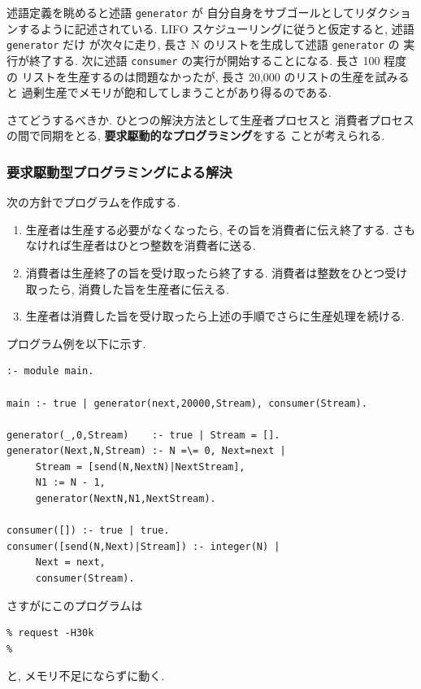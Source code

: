\documentclass[a4,titlepage]{jsreport}
\let\dg\bf
\begin{document}
述語定義を眺めると述語 {\tt generator} が
自分自身をサブゴールとしてリダクションするように記述されている.  
LIFO スケジューリングに従うと仮定すると, 述語{\tt generator} だけ
が次々に走り, 長さ N  のリストを生成して述語 {\tt generator} の
実行が終了する.  次に述語 {\tt consumer} の実行が開始することになる.  
長さ 100 程度の
リストを生産するのは問題なかったが, 長さ 20,000 のリストの生産を試みると
過剰生産でメモリが飽和してしまうことがあり得るのである.  

さてどうするべきか.  ひとつの解決方法として生産者プロセスと
消費者プロセスの間で同期をとる, {\dg 要求駆動的なプログラミング}をする
ことが考えられる.  

\subsubsection{要求駆動型プログラミングによる解決}
次の方針でプログラムを作成する.  
\begin{enumerate}
\item 生産者は生産する必要がなくなったら, その旨を消費者に伝え終了する.  
さもなければ生産者はひとつ整数を消費者に送る.  
\item 消費者は生産終了の旨を受け取ったら終了する.  
消費者は整数をひとつ受け取ったら, 消費した旨を生産者に伝える.  
\item 生産者は消費した旨を受け取ったら上述の手順でさらに生産処理を続ける.  
\end{enumerate}

プログラム例を以下に示す.  
\begin{center}
\begin{minipage}{12cm}
\begin{Verbatim}[baselinestretch=0.8]
%  request.kl1
:- module main.

main :- true | generator(next,20000,Stream), consumer(Stream).

generator(_,0,Stream)    :- true | Stream = [].
generator(Next,N,Stream) :- N =\= 0, Next=next |
     Stream = [send(N,NextN)|NextStream],
     N1 := N - 1,
     generator(NextN,N1,NextStream).

consumer([]) :- true | true.
consumer([send(N,Next)|Stream]) :- integer(N) |
     Next = next,
     consumer(Stream).
\end{Verbatim}
\end{minipage}
\end{center}

さすがにこのプログラムは
\begin{Verbatim}[frame=single,baselinestretch=0.8]
% klic -o request request.kl1
% request -H30k
%
\end{Verbatim}
と, メモリ不足にならずに動く.  
\end{document}

